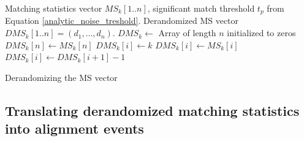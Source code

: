\documentclass[unnumsec,webpdf,modern,large]{biorxiv}%
\theoremstyle{thmstyleone}%
\theoremstyle{thmstyletwo}%
\theoremstyle{thmstylethree}%
\begin{document}

\begin{algorithm}[t]
\begin{algorithmic}[1]
\small
\Require Matching statistics vector $MS_k[1..n]$, significant match threshold $t_p$ from Equation \ref{analytic_noise_treshold}.
\Ensure Derandomized MS vector $DMS_k[1..n] = (d_1, \ldots, d_{n})$.
\State $DMS_k \leftarrow $ Array of length $n$ initialized to zeros
\State $DMS_k[n] \gets MS_k[n]$
\State $DMS_k[i] \gets k$
    \State $DMS_k[i] \gets MS_k[i]$
\Else
    \State $DMS_k[i] \gets DMS_k[i+1]-1$
\EndIf
\EndFor
\caption{\small Derandomizing the MS vector} 
\label{alg:derandomized-MS}
\end{algorithmic}
\end{algorithm}

\subsection{Translating derandomized matching statistics into alignment events}
 


\end{document}
